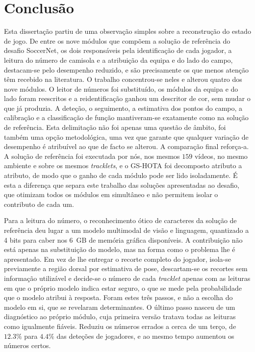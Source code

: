 \chapter{Conclusão}\label{cap:conclusao}

Esta dissertação partiu de uma observação simples sobre a reconstrução do estado de jogo. De entre
os nove módulos que compõem a solução de referência do desafio SoccerNet, os dois responsáveis pela
identificação de cada jogador, a leitura do número de camisola e a atribuição da equipa e do lado do
campo, destacam-se pelo desempenho reduzido, e são precisamente os que menos atenção têm recebido
na literatura. O trabalho concentrou-se neles e alterou quatro dos nove módulos. O leitor de
números foi substituído, os módulos da equipa e do lado foram reescritos e a reidentificação ganhou
um descritor de cor, sem mudar o que já produzia. A deteção, o seguimento, a
estimativa dos pontos do campo, a calibração e a classificação de função mantiveram-se exatamente
como na solução de referência. Esta delimitação não foi apenas uma questão de âmbito, foi também uma
opção metodológica, uma vez que garante que qualquer variação de desempenho é atribuível ao que de
facto se alterou. A comparação final reforça-a. A solução de referência foi executada por nós, nos
mesmos $159$ vídeos, no mesmo ambiente e sobre os mesmos \emph{tracklets}, e o GS-HOTA foi
decomposto atributo a atributo, de modo que o ganho de cada módulo pode ser lido isoladamente. É
esta a diferença que separa este trabalho das soluções apresentadas ao desafio, que otimizam todos
os módulos em simultâneo e não permitem isolar o contributo de cada um.

Para a leitura do número, o reconhecimento ótico de caracteres da solução de referência deu lugar a
um modelo multimodal de visão e linguagem, quantizado a 4 bits para caber nos 6~GB de memória
gráfica disponíveis. A contribuição não está apenas na substituição do modelo, mas na forma como o
problema lhe é apresentado. Em vez de lhe entregar o recorte completo do jogador, isola-se
previamente a região dorsal por estimativa de pose, descartam-se os recortes sem informação
utilizável e decide-se o número de cada \emph{tracklet} apenas com as leituras em que o próprio modelo
indica estar seguro, o que se mede pela probabilidade que o modelo atribui à resposta. Foram estes três passos, e não
a escolha do modelo em si, que se revelaram determinantes. O último passo nasceu de um diagnóstico ao
próprio módulo, cuja primeira versão tratava todas as leituras como igualmente fiáveis. Reduziu os
números errados a cerca de um terço, de $12.3\%$ para $4.4\%$ das deteções de jogadores, e ao mesmo
tempo aumentou os números certos.

